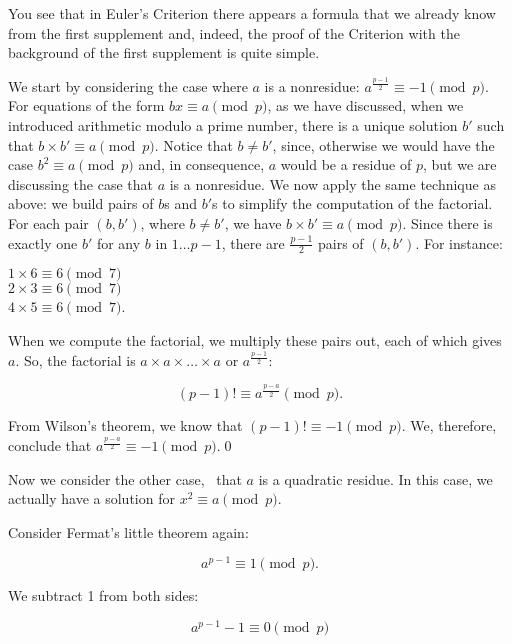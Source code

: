 \documentclass{scrreprt}
\newcommand{\Varid}[1]{\mathit{#1}}
\begin{document}
You see that in Euler's Criterion there appears
a formula that we already know from the first supplement
and, indeed, the proof of the Criterion 
with the background of the first supplement is quite simple.

We start by considering the case where $a$ is a nonresidue:
$a^{\frac{p-1}{2}} \equiv -1 \pmod{p}$.
For equations of the form $bx \equiv a \pmod{p}$,
as we have discussed, when we introduced 
arithmetic modulo a prime number,
there is a unique solution $b'$ 
such that $b \times b' \equiv a \pmod{p}$.
Notice that $b \neq b'$, since, otherwise
we would have the case $b^2 \equiv a \pmod{p}$ and,
in consequence, $a$ would be a residue of $p$,
but we are discussing the case that $a$ is
a nonresidue.
We now apply the same technique as above:
we build pairs of $b$s and $b'$s
to simplify the computation of the factorial.
For each pair \ensuremath{(\Varid{b},\Varid{b'})}, where $b \neq b'$, we have
$b \times b' \equiv a \pmod{p}$.
Since there is exactly one $b'$ for any $b$ in $1\dots p-1$,
there are $\frac{p-1}{2}$ pairs of $(b,b')$.
For instance:

$1 \times 6 \equiv 6 \pmod{7}$\\
$2 \times 3 \equiv 6 \pmod{7}$\\
$4 \times 5 \equiv 6 \pmod{7}$.

When we compute the factorial,
we multiply these pairs out, each of which gives $a$.
So, the factorial is $a \times a \times \dots \times a$
or $a^{\frac{p-1}{2}}$:

\begin{equation}
  (p-1)! \equiv a^{\frac{p-a}{2}} \pmod{p}.
\end{equation}

From Wilson's theorem, we know
that $(p-1)! \equiv -1 \pmod{p}$.
We, therefore, conclude that 
$a^{\frac{p-a}{2}} \equiv -1 \pmod{p}$.\qed

Now we consider the other case, \ie\
that $a$ is a quadratic residue.
In this case, we actually have a solution
for $x^2 \equiv a \pmod{p}$.

Consider Fermat's little theorem again:

\begin{equation} 
a^{p-1} \equiv 1 \pmod{p}.
\end{equation} 

We subtract 1 from both sides:

\begin{equation}\label{eqRes_FermatMinus1} 
a^{p-1} - 1 \equiv 0 \pmod{p}
\end{equation} 
\end{document}
